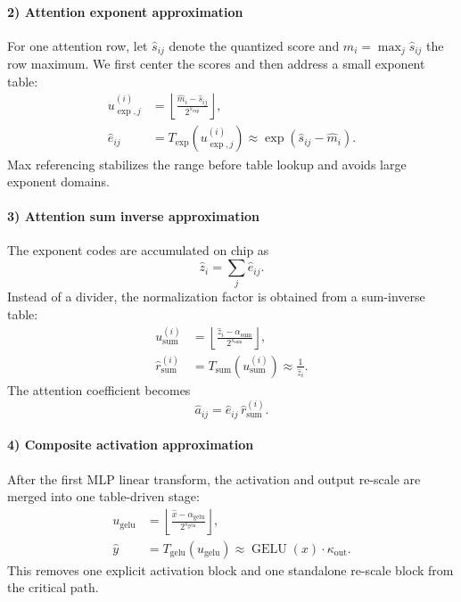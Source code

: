 \documentclass[journal]{IEEEtran}
\begin{document}
\paragraph*{2) Attention exponent approximation}
For one attention row, let $\hat s_{ij}$ denote the quantized score and $\hat m_i=\max_j \hat s_{ij}$ the row maximum. We first center the scores and then address a small exponent table:
\begin{align}
u^{(i)}_{\exp,j} &= \left\lfloor \frac{\hat m_i-\hat s_{ij}}{2^{s_{\exp}}}\right\rfloor,\\
\hat e_{ij} &= T_{\exp}\!\left(u^{(i)}_{\exp,j}\right)
\approx \exp\!\left(\hat s_{ij}-\hat m_i\right).
\end{align}
Max referencing stabilizes the range before table lookup and avoids large exponent domains.

\paragraph*{3) Attention sum inverse approximation}
The exponent codes are accumulated on chip as
\begin{equation}
\hat z_i = \sum_j \hat e_{ij}.
\end{equation}
Instead of a divider, the normalization factor is obtained from a sum-inverse table:
\begin{align}
u^{(i)}_{\mathrm{sum}} &= \left\lfloor \frac{\hat z_i-\alpha_{\mathrm{sum}}}{2^{s_{\mathrm{sum}}}} \right\rfloor,\\
\hat r^{(i)}_{\mathrm{sum}} &= T_{\mathrm{sum}}\!\left(u^{(i)}_{\mathrm{sum}}\right)
\approx \frac{1}{\hat z_i}.
\end{align}
The attention coefficient becomes
\begin{equation}
\hat a_{ij} = \hat e_{ij}\,\hat r^{(i)}_{\mathrm{sum}}.
\end{equation}

\paragraph*{4) Composite activation approximation}
After the first MLP linear transform, the activation and output re-scale are merged into one table-driven stage:
\begin{align}
u_{\mathrm{gelu}} &= \left\lfloor \frac{\hat x-\alpha_{\mathrm{gelu}}}{2^{s_{\mathrm{gelu}}}} \right\rfloor,\\
\hat y &= T_{\mathrm{gelu}}\!\left(u_{\mathrm{gelu}}\right)
\approx \operatorname{GELU}(x)\cdot\kappa_{\mathrm{out}}.
\end{align}
This removes one explicit activation block and one standalone re-scale block from the critical path.
\end{document}
